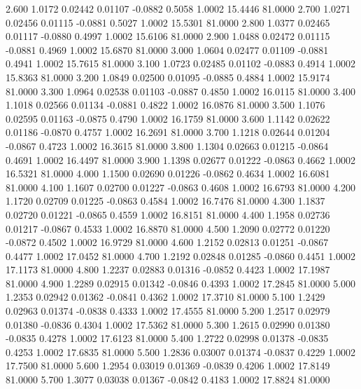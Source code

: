    2.600   1.0172   0.02442   0.01107  -0.0882   0.5058   1.0002  15.4446  81.0000
   2.700   1.0271   0.02456   0.01115  -0.0881   0.5027   1.0002  15.5301  81.0000
   2.800   1.0377   0.02465   0.01117  -0.0880   0.4997   1.0002  15.6106  81.0000
   2.900   1.0488   0.02472   0.01115  -0.0881   0.4969   1.0002  15.6870  81.0000
   3.000   1.0604   0.02477   0.01109  -0.0881   0.4941   1.0002  15.7615  81.0000
   3.100   1.0723   0.02485   0.01102  -0.0883   0.4914   1.0002  15.8363  81.0000
   3.200   1.0849   0.02500   0.01095  -0.0885   0.4884   1.0002  15.9174  81.0000
   3.300   1.0964   0.02538   0.01103  -0.0887   0.4850   1.0002  16.0115  81.0000
   3.400   1.1018   0.02566   0.01134  -0.0881   0.4822   1.0002  16.0876  81.0000
   3.500   1.1076   0.02595   0.01163  -0.0875   0.4790   1.0002  16.1759  81.0000
   3.600   1.1142   0.02622   0.01186  -0.0870   0.4757   1.0002  16.2691  81.0000
   3.700   1.1218   0.02644   0.01204  -0.0867   0.4723   1.0002  16.3615  81.0000
   3.800   1.1304   0.02663   0.01215  -0.0864   0.4691   1.0002  16.4497  81.0000
   3.900   1.1398   0.02677   0.01222  -0.0863   0.4662   1.0002  16.5321  81.0000
   4.000   1.1500   0.02690   0.01226  -0.0862   0.4634   1.0002  16.6081  81.0000
   4.100   1.1607   0.02700   0.01227  -0.0863   0.4608   1.0002  16.6793  81.0000
   4.200   1.1720   0.02709   0.01225  -0.0863   0.4584   1.0002  16.7476  81.0000
   4.300   1.1837   0.02720   0.01221  -0.0865   0.4559   1.0002  16.8151  81.0000
   4.400   1.1958   0.02736   0.01217  -0.0867   0.4533   1.0002  16.8870  81.0000
   4.500   1.2090   0.02772   0.01220  -0.0872   0.4502   1.0002  16.9729  81.0000
   4.600   1.2152   0.02813   0.01251  -0.0867   0.4477   1.0002  17.0452  81.0000
   4.700   1.2192   0.02848   0.01285  -0.0860   0.4451   1.0002  17.1173  81.0000
   4.800   1.2237   0.02883   0.01316  -0.0852   0.4423   1.0002  17.1987  81.0000
   4.900   1.2289   0.02915   0.01342  -0.0846   0.4393   1.0002  17.2845  81.0000
   5.000   1.2353   0.02942   0.01362  -0.0841   0.4362   1.0002  17.3710  81.0000
   5.100   1.2429   0.02963   0.01374  -0.0838   0.4333   1.0002  17.4555  81.0000
   5.200   1.2517   0.02979   0.01380  -0.0836   0.4304   1.0002  17.5362  81.0000
   5.300   1.2615   0.02990   0.01380  -0.0835   0.4278   1.0002  17.6123  81.0000
   5.400   1.2722   0.02998   0.01378  -0.0835   0.4253   1.0002  17.6835  81.0000
   5.500   1.2836   0.03007   0.01374  -0.0837   0.4229   1.0002  17.7500  81.0000
   5.600   1.2954   0.03019   0.01369  -0.0839   0.4206   1.0002  17.8149  81.0000
   5.700   1.3077   0.03038   0.01367  -0.0842   0.4183   1.0002  17.8824  81.0000
